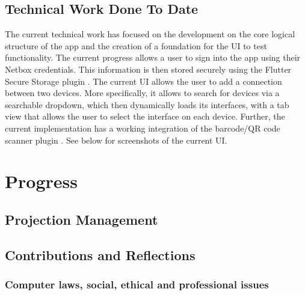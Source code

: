 \documentclass [11pt,letterpaper]{article}
\begin{document}
\subsection{Technical Work Done To Date}
\label{sec:technical_work}
The current technical work has focused on the development on the core logical structure of the app and the creation of a foundation for the UI to test functionality. The current progress allows a user to sign into the app using their Netbox credentials. This information is then stored securely using the Flutter Secure Storage plugin \cite{securestorage}. The current UI allows the user to add a connection between two devices. More specifically, it allows to search for devices via a searchable dropdown, which then dynamically loads its interfaces, with a tab view that allows the user to select the interface on each device. Further, the current implementation has a working integration of the barcode/QR code scanner plugin \cite{barcodeScannerPlugin}. See below for screenshots of the current UI. 



\section{Progress}
\label{sec:progress}
\subsection{Projection Management}
\label{sec:project_management}
\subsection{Contributions and Reflections}
\label{sec:contributions}
\subsubsection{Computer laws, social, ethical and professional issues}
\label{sec:computer_laws}
\pagebreak

 
\end{document}
